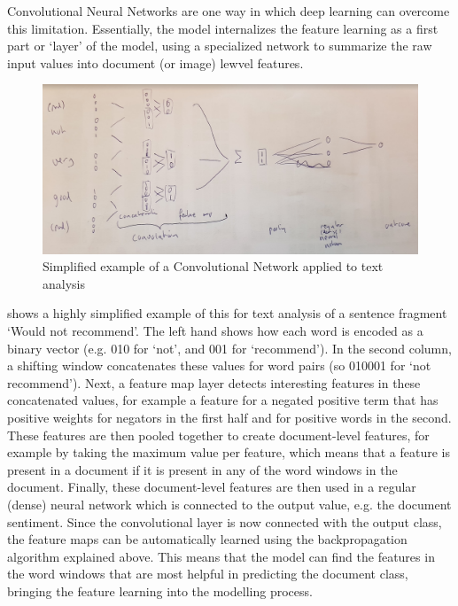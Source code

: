 Convolutional Neural Networks are one way in which deep learning can overcome this limitation.
Essentially, the model internalizes the feature learning as a first part or `layer' of the model,
using a specialized network to summarize the raw input values into document (or image) lewvel features. 

\begin{figure}
  \includegraphics[width=\linewidth]{figures/ch09_cnn.png}
  \caption{Simplified example of a Convolutional Network applied to text analysis}
  \label{fig:cnn}
  \end{figure}

 shows a highly simplified example of this for text analysis of a sentence fragment `Would not recommend'.
The left hand shows how each word is encoded as a binary vector (e.g. 010 for `not', and 001 for `recommend').
In the second column, a shifting window concatenates these values for word pairs (so 010001 for `not recommend').
Next, a feature map layer detects interesting features in these concatenated values, for example
a feature for a negated positive term that has positive weights for negators in the first half and for positive words in the second.
These features are then pooled together to create document-level features,
for example by taking the maximum value per feature, which means that a feature is present in a document if it is present in any of the word windows in the document.
Finally, these document-level features are then used in a regular (dense) neural network which is connected to the output value, e.g. the document sentiment.
Since the convolutional layer is now connected with the output class, the feature maps can be automatically learned using the backpropagation algorithm explained above.
This means that the model can find the features in the word windows that are most helpful in predicting the document class, bringing the feature learning into the modelling process.

